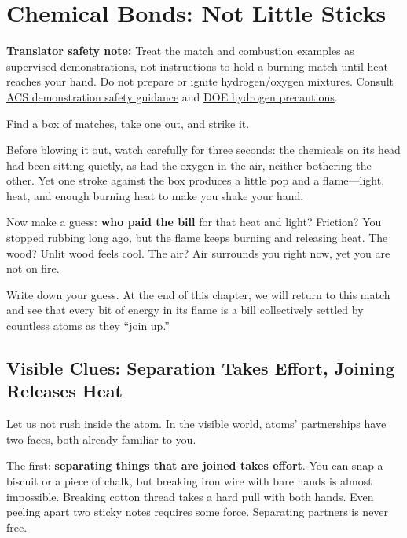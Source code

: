 \chapter{Chemical Bonds: Not Little Sticks}

\begin{kaichang}
\textbf{Translator safety note:} Treat the match and combustion examples as supervised demonstrations, not instructions to hold a burning match until heat reaches your hand. Do not prepare or ignite hydrogen/oxygen mixtures. Consult \href{https://institute.acs.org/acs-center/lab-safety/education-training/safer-experiments.html}{ACS demonstration safety guidance} and \href{https://www.energy.gov/cmei/fuels/safe-use-hydrogen}{DOE hydrogen precautions}.

Find a box of matches, take one out, and strike it.

Before blowing it out, watch carefully for three seconds: the chemicals on its head had been sitting quietly, as had the oxygen in the air, neither bothering the other. Yet one stroke against the box produces a little pop and a flame---light, heat, and enough burning heat to make you shake your hand.

Now make a guess: \textbf{who paid the bill} for that heat and light? Friction? You stopped rubbing long ago, but the flame keeps burning and releasing heat. The wood? Unlit wood feels cool. The air? Air surrounds you right now, yet you are not on fire.

Write down your guess. At the end of this chapter, we will return to this match and see that every bit of energy in its flame is a bill collectively settled by countless atoms as they ``join up.''
\end{kaichang}

\section{Visible Clues: Separation Takes Effort, Joining Releases Heat}

Let us not rush inside the atom. In the visible world, atoms' partnerships have two faces, both already familiar to you.

The first: \textbf{separating things that are joined takes effort}. You can snap a biscuit or a piece of chalk, but breaking iron wire with bare hands is almost impossible. Breaking cotton thread takes a hard pull with both hands. Even peeling apart two sticky notes requires some force. Separating partners is never free.

